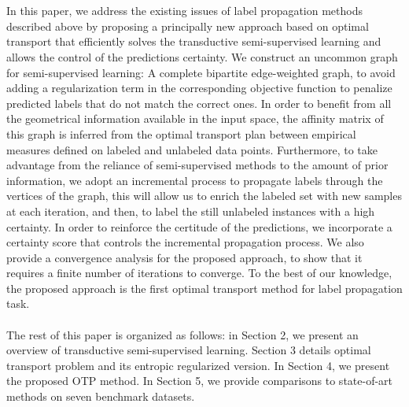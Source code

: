 \documentclass[conference]{IEEEtran}
\begin{document}
\\
\\ In this paper, we address the existing issues of label propagation methods described above by proposing a principally new approach based on optimal transport that efficiently solves the transductive semi-supervised learning and allows the control of the predictions certainty. We construct an uncommon graph for semi-supervised learning: A complete bipartite edge-weighted graph, to avoid adding a regularization term in the corresponding objective function to penalize predicted labels that do not match the correct ones. In order to benefit from all the geometrical information available in the input space, the affinity matrix of this graph is inferred from the optimal transport plan between empirical measures defined on labeled and unlabeled data points. Furthermore, to take advantage from the reliance of semi-supervised methods to the amount of prior information, we adopt an incremental process to propagate labels through the vertices of the graph, this will allow us to enrich the labeled set with new samples at each iteration, and then, to label the still unlabeled instances with a high certainty. In order to reinforce the certitude of the predictions, we incorporate a certainty score that controls the incremental propagation process. We also provide a convergence analysis for the proposed approach, to show that it requires a finite number of iterations to converge. To the best of our knowledge, the proposed approach is the first optimal transport method for label propagation task.
\\
\\ The rest of this paper is organized as follows: in Section 2, we present an overview of transductive semi-supervised learning. Section 3 details optimal transport problem and its entropic regularized version. In Section 4, we present the proposed OTP method. In Section 5, we provide comparisons to state-of-art methods on seven benchmark datasets. 
\end{document}
